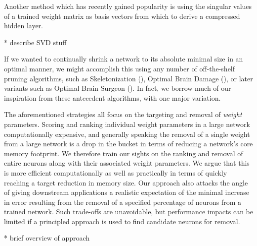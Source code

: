 Another method which has recently gained popularity is using the singular values of a trained weight matrix as basis vectors from which to derive a compressed hidden layer. 

* describe SVD stuff

If we wanted to continually shrink a network to its absolute minimal size in an optimal manner, we might accomplish this using any number of off-the-shelf pruning algorithms, such as Skeletonization (\cite{mozer1989skeletonization}), Optimal Brain Damage (\cite{lecun1989optimal}), or later variants such as Optimal Brain Surgeon (\cite{hassibi1993second}). In fact, we borrow much of our inspiration from these antecedent algorithms, with one major variation. 




The aforementioned strategies all focus on the targeting and removal of \textit{weight} parameters. Scoring and ranking individual weight parameters in a large network computationally expensive, and generally speaking the removal of a single weight from a large network is a drop in the bucket in terms of reducing a network's core memory footprint. We therefore train our sights on the ranking and removal of entire neurons along with their associated weight parameters. We argue that this is more efficient computationally as well as practically in terms of quickly reaching a target reduction in memory size. Our approach also attacks the angle of giving downstream applications a realistic expectation of the minimal increase in error resulting from the removal of a specified percentage of neurons from a trained network. Such trade-offs are unavoidable, but performance impacts can be limited if a principled approach is used to find candidate neurons for removal. 

* brief overview of approach